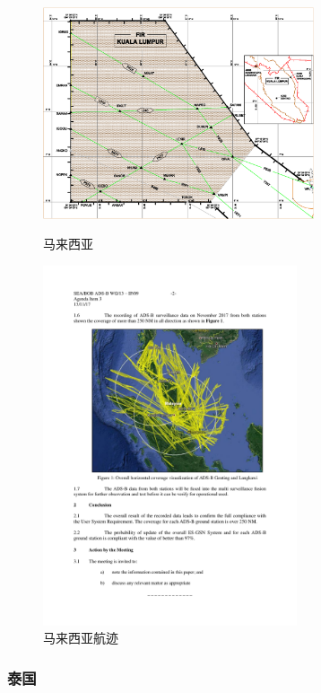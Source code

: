 \begin{figure}[htbp]
\centering
\begin{minipage}[t]{0.48\textwidth}
\centering
\includegraphics[width=8cm]{pic/malaysia_cover.png}
\caption{马来西亚}
\label{fig:malaysia_cover}
\end{minipage}
\begin{minipage}[t]{0.48\textwidth}
\centering
\includegraphics[width=7.5cm]{pic/Malaysia.pdf}
\caption{马来西亚航迹}
\label{fig:Malaysia}
\end{minipage}
\end{figure}

\begin{figure}[htbp]

\end{figure}

\subsubsection{泰国}

